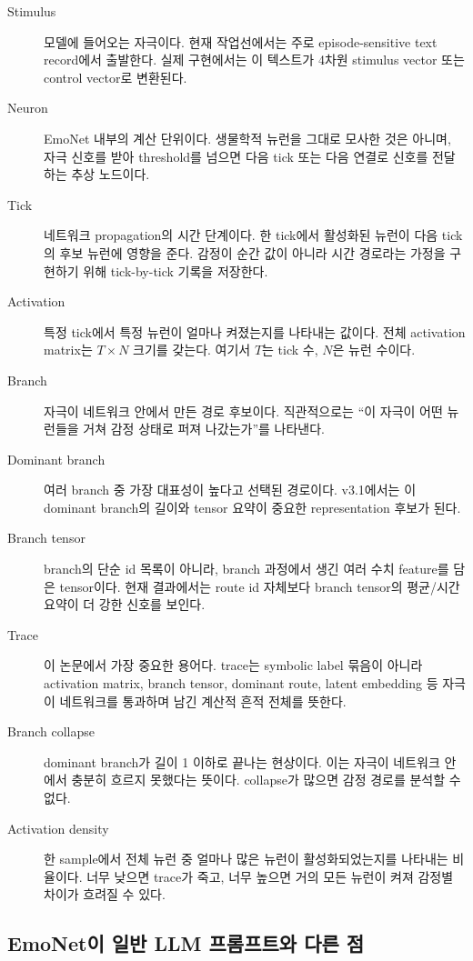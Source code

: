 \documentclass[11pt,a4paper]{article}
\begin{document}
\begin{description}
  \item[Stimulus] 모델에 들어오는 자극이다. 현재 작업선에서는 주로 episode-sensitive text record에서 출발한다. 실제 구현에서는 이 텍스트가 4차원 stimulus vector 또는 control vector로 변환된다.
  \item[Neuron] EmoNet 내부의 계산 단위이다. 생물학적 뉴런을 그대로 모사한 것은 아니며, 자극 신호를 받아 threshold를 넘으면 다음 tick 또는 다음 연결로 신호를 전달하는 추상 노드이다.
  \item[Tick] 네트워크 propagation의 시간 단계이다. 한 tick에서 활성화된 뉴런이 다음 tick의 후보 뉴런에 영향을 준다. 감정이 순간 값이 아니라 시간 경로라는 가정을 구현하기 위해 tick-by-tick 기록을 저장한다.
  \item[Activation] 특정 tick에서 특정 뉴런이 얼마나 켜졌는지를 나타내는 값이다. 전체 activation matrix는 \(T \times N\) 크기를 갖는다. 여기서 \(T\)는 tick 수, \(N\)은 뉴런 수이다.
  \item[Branch] 자극이 네트워크 안에서 만든 경로 후보이다. 직관적으로는 ``이 자극이 어떤 뉴런들을 거쳐 감정 상태로 퍼져 나갔는가''를 나타낸다.
  \item[Dominant branch] 여러 branch 중 가장 대표성이 높다고 선택된 경로이다. v3.1에서는 이 dominant branch의 길이와 tensor 요약이 중요한 representation 후보가 된다.
  \item[Branch tensor] branch의 단순 id 목록이 아니라, branch 과정에서 생긴 여러 수치 feature를 담은 tensor이다. 현재 결과에서는 route id 자체보다 branch tensor의 평균/시간 요약이 더 강한 신호를 보인다.
  \item[Trace] 이 논문에서 가장 중요한 용어다. trace는 symbolic label 묶음이 아니라 activation matrix, branch tensor, dominant route, latent embedding 등 자극이 네트워크를 통과하며 남긴 계산적 흔적 전체를 뜻한다.
  \item[Branch collapse] dominant branch가 길이 1 이하로 끝나는 현상이다. 이는 자극이 네트워크 안에서 충분히 흐르지 못했다는 뜻이다. collapse가 많으면 감정 경로를 분석할 수 없다.
  \item[Activation density] 한 sample에서 전체 뉴런 중 얼마나 많은 뉴런이 활성화되었는지를 나타내는 비율이다. 너무 낮으면 trace가 죽고, 너무 높으면 거의 모든 뉴런이 켜져 감정별 차이가 흐려질 수 있다.
\end{description}

\subsection{EmoNet이 일반 LLM 프롬프트와 다른 점}
\end{document}
